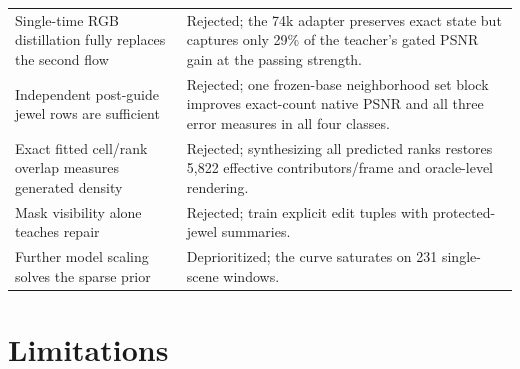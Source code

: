 \documentclass[10pt]{article}
\begin{document}
\begin{table}[H]
\begin{tabularx}{\linewidth}{@{}XX@{}}
Single-time RGB distillation fully replaces the second flow & Rejected; the 74k adapter preserves exact state but captures only 29\% of the teacher's gated PSNR gain at the passing strength. \\
Independent post-guide jewel rows are sufficient & Rejected; one frozen-base neighborhood set block improves exact-count native PSNR and all three error measures in all four classes. \\
Exact fitted cell/rank overlap measures generated density & Rejected; synthesizing all predicted ranks restores 5,822 effective contributors/frame and oracle-level rendering. \\
Mask visibility alone teaches repair & Rejected; train explicit edit tuples with protected-jewel summaries. \\
Further model scaling solves the sparse prior & Deprioritized; the curve saturates on 231 single-scene windows. \\
\bottomrule
\end{tabularx}
\end{table}

\section{Limitations}
\end{document}

